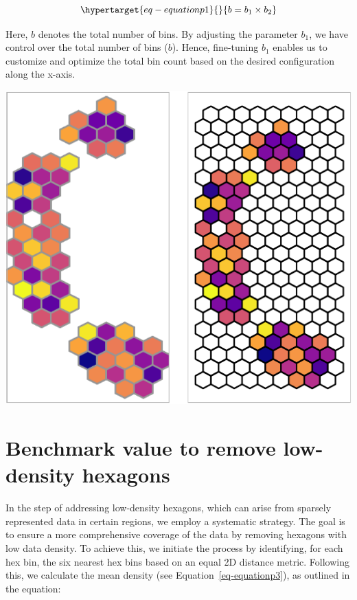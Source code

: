 \documentclass[
  12pt]{article}
\begin{document}
\begin{equation}\protect\hypertarget{eq-equationp1}{}{
 b = b_1 \times b_2
}\label{eq-equationp1}\end{equation}

Here, \(b\) denotes the total number of bins. By adjusting the parameter
\(b_1\), we have control over the total number of bins (\(b\)). Hence,
fine-tuning \(b_1\) enables us to customize and optimize the total bin
count based on the desired configuration along the x-axis.

\includegraphics[width=1\textwidth,height=\textheight]{appendix_files/figure-pdf/unnamed-chunk-9-1.pdf}

\hypertarget{benchmark-value-to-remove-low-density-hexagons}{%
\section{Benchmark value to remove low-density
hexagons}\label{benchmark-value-to-remove-low-density-hexagons}}

In the step of addressing low-density hexagons, which can arise from
sparsely represented data in certain regions, we employ a systematic
strategy. The goal is to ensure a more comprehensive coverage of the
data by removing hexagons with low data density. To achieve this, we
initiate the process by identifying, for each hex bin, the six nearest
hex bins based on an equal 2D distance metric. Following this, we
calculate the mean density (see Equation~\ref{eq-equationp3}), as
outlined in the equation:
\end{document}
